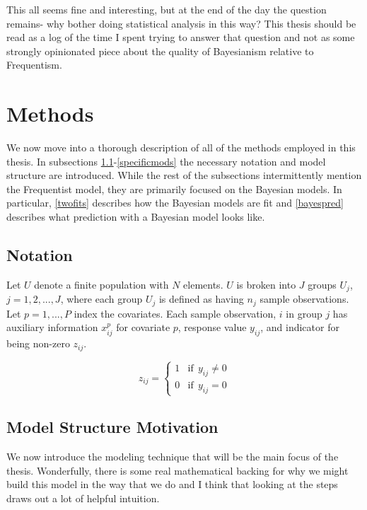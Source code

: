 \documentclass[12pt,twoside]{reedthesis}
\begin{document}
This all seems fine and interesting, but at the end of the day the question remains- why bother doing statistical analysis in this way? This thesis should be read as a log of the time I spent trying to answer that question and not as some strongly opinionated piece about the quality of Bayesianism relative to Frequentism.

\hypertarget{methods-sec}{%
\chapter{Methods}\label{methods-sec}}

We now move into a thorough description of all of the methods employed in this thesis. In subsections \ref{notation}-\ref{specificmods} the necessary notation and model structure are introduced. While the rest of the subsections intermittently mention the Frequentist model, they are primarily focused on the Bayesian models. In particular, \ref{twofits} describes how the Bayesian models are fit and \ref{bayespred} describes what prediction with a Bayesian model looks like.

\hypertarget{notation}{%
\section{Notation}\label{notation}}

Let \(U\) denote a finite population with \(N\) elements. \(U\) is broken into \(J\) groups \(U_j\), \(j = 1, 2, ..., J\), where each group \(U_j\) is defined as having \(n_j\) sample observations. Let \(p = 1, ..., P\) index the covariates. Each sample observation, \(i\) in group \(j\) has auxiliary information \(x_{ij}^p\) for covariate \(p\), response value \(y_{ij}\), and indicator for being non-zero \(z_{ij}\).

\[
z_{ij} =
\begin{cases}
1 & \text{if}\ \ y_{ij} \ne 0 \\
0 & \text{if} \ \ y_{ij} = 0
\end{cases}
\]

\hypertarget{model-structure-motivation}{%
\section{Model Structure Motivation}\label{model-structure-motivation}}

We now introduce the modeling technique that will be the main focus of the thesis. Wonderfully, there is some real mathematical backing for why we might build this model in the way that we do and I think that looking at the steps draws out a lot of helpful intuition.
\end{document}
